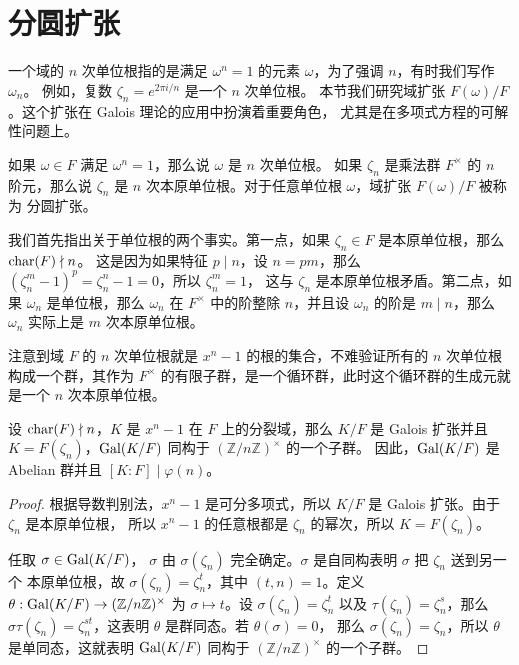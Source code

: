 \section{分圆扩张}

一个域的 $n$ 次单位根指的是满足 $\omega^n=1$ 的元素 $\omega$，为了强调 $n$，有时我们写作 $\omega_n$。
例如，复数 $\zeta_n=e^{2\pi i/n}$ 是一个 $n$ 次单位根。
本节我们研究域扩张 $F(\omega)/F$。这个扩张在 Galois 理论的应用中扮演着重要角色，
尤其是在多项式方程的可解性问题上。

\begin{definition}
  如果 $\omega\in F$ 满足 $\omega^n=1$，那么说 $\omega$ 是 $n$ 次单位根。
  如果 $\zeta_n$ 是乘法群 $F^\times$ 的 $n$ 阶元，那么说 $\zeta_n$ 是 
  $n$ 次本原单位根。对于任意单位根 $\omega$，域扩张 $F(\omega)/F$ 被称为
  分圆扩张。
\end{definition}

我们首先指出关于单位根的两个事实。第一点，如果 $\zeta_n\in F$ 是本原单位根，那么 $\operatorname{char}(F)\nmid n$。
这是因为如果特征 $p\mid n$，设 $n=pm$，那么 $(\zeta_n^m-1)^p=\zeta_n^n-1=0$，所以 $\zeta_n^m=1$，
这与 $\zeta_n$ 是本原单位根矛盾。第二点，如果 $\omega_n$ 是单位根，那么 $\omega_n$ 在 $F^\times$
中的阶整除 $n$，并且设 $\omega_n$ 的阶是 $m\mid n$，那么 $\omega_n$ 实际上是 $m$ 次本原单位根。

注意到域 $F$ 的 $n$ 次单位根就是 $x^n-1$ 的根的集合，不难验证所有的 $n$ 次单位根构成一个群，其作为
$F^\times$ 的有限子群，是一个循环群，此时这个循环群的生成元就是一个 $n$ 次本原单位根。

\begin{proposition}
  设 $\operatorname{char}(F)\nmid n$，$K$ 是 $x^n-1$ 在 $F$ 上的分裂域，那么 $K/F$ 是 Galois 扩张并且
  $K=F(\zeta_n)$，$\operatorname{Gal}(K/F)$ 同构于 $(\mathbb{Z}/n \mathbb{Z})^\times$ 的一个子群。
  因此，$\operatorname{Gal}(K/F)$ 是 Abelian 群并且 $[K:F]\mid \varphi(n)$。
\end{proposition}
\begin{proof}
  根据导数判别法，$x^n-1$ 是可分多项式，所以 $K/F$ 是 Galois 扩张。由于 $\zeta_n$ 是本原单位根，
  所以 $x^n-1$ 的任意根都是 $\zeta_n$ 的幂次，所以 $K=F(\zeta_n)$。
  
  任取 $\sigma\in\operatorname{Gal}(K/F)$，
  $\sigma$ 由 $\sigma(\zeta_n)$ 完全确定。$\sigma$ 是自同构表明 $\sigma$ 把 $\zeta_n$ 送到另一个
  本原单位根，故 $\sigma(\zeta_n)=\zeta_n^t$，其中 $(t,n)=1$。定义 $\theta:\operatorname{Gal}(K/F)\to (\mathbb{Z}/n \mathbb{Z})^\times$
  为 $\sigma\mapsto t$。设 $\sigma(\zeta_n)=\zeta_n^t$ 以及 $\tau(\zeta_n)=\zeta_n^s$，那么
  $\sigma\tau(\zeta_n)=\zeta_n^{st}$，这表明 $\theta$ 是群同态。若 $\theta(\sigma)=0$，
  那么 $\sigma(\zeta_n)=\zeta_n$，所以 $\theta$ 是单同态，这就表明 $\operatorname{Gal}(K/F)$ 同构于 
  $(\mathbb{Z}/n \mathbb{Z})^\times$ 的一个子群。
\end{proof}

